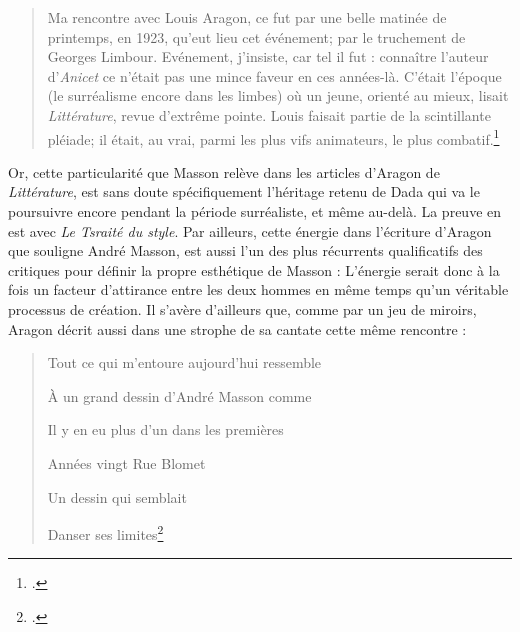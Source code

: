 \begin{quote} Ma rencontre avec Louis Aragon, ce fut par une belle matinée de printemps, en 1923, qu’eut lieu cet événement; par le truchement de Georges Limbour. Evénement, j’insiste, car tel il fut : connaître l’auteur d’\emph{Anicet} ce n’était pas une mince faveur en ces années-là. C’était l’époque (le surréalisme encore dans les limbes) où un jeune, orienté au mieux, lisait \emph{Littérature}, revue d’extrême pointe. Louis faisait partie de la scintillante pléiade; il était, au vrai, parmi les plus vifs animateurs, le plus combatif.\footcite[p84]{rebelle}\end{quote}

	Or, cette particularité que Masson relève dans les articles d’Aragon de \emph{Littérature}, est sans doute spécifiquement l’héritage retenu de Dada qui va le poursuivre encore pendant la période surréaliste, et même au-delà. La preuve en est avec \emph{Le Tsraité du style}. Par ailleurs, cette énergie dans l’écriture d’Aragon que souligne André Masson, est aussi l’un des plus récurrents qualificatifs des critiques pour définir la propre esthétique de Masson : L’énergie serait donc à la fois un facteur d’attirance entre les deux hommes en même temps qu’un véritable processus de création. Il s’avère d’ailleurs que, comme par un jeu de miroirs, Aragon décrit aussi dans une strophe de sa cantate cette même rencontre :

    
\begin{verse}    
Tout ce qui m’entoure aujourd’hui ressemble

À un grand dessin d’André Masson comme

Il y en eu plus d’un dans les premières

Années vingt Rue Blomet 

Un dessin qui semblait

Danser ses limites\footcite[p. 682]{ecritssurla} 
\end{verse}

